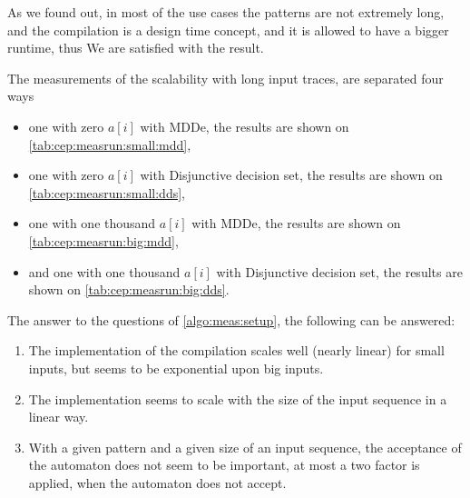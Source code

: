         As we found out, in most of the use cases the patterns are not extremely long, and the compilation is a design time concept, and it is allowed to have a bigger runtime, thus We are satisfied with the result.
        
        The measurements of the scalability with long input traces, are separated four ways
        \begin{itemize}
            \item one with zero $a[i]$ with MDDe, the results are shown on \cref{tab:cep:measrun:small:mdd},
            \item one with zero $a[i]$ with Disjunctive  decision set, the results are shown on \cref{tab:cep:measrun:small:dds},
            \item one with one thousand $a[i]$ with MDDe, the results are shown on \cref{tab:cep:measrun:big:mdd},
            \item and one with one thousand $a[i]$ with Disjunctive decision set, the results are shown on \cref{tab:cep:measrun:big:dds}.
        \end{itemize}
    
        The answer to the questions of \cref{algo:meas:setup}, the following can be answered:
        \begin{enumerate}
            \item The implementation of the compilation scales well (nearly linear) for small inputs, but seems to be exponential upon big inputs.
            \item The implementation seems to scale with the size of the input sequence in a linear way.
            \item With a given pattern and a given size of an input sequence, the acceptance of the automaton does not seem to be important, at most a two factor is applied, when the automaton does not accept.
        \end{enumerate}
        
